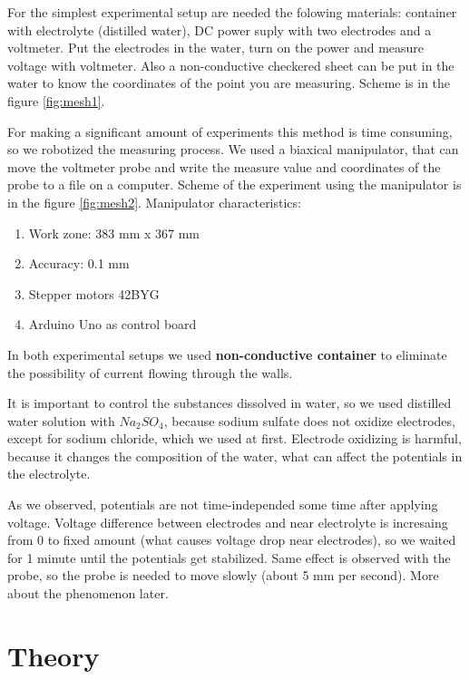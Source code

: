 \documentclass{article}
\begin{document}
For the simplest experimental setup are needed the folowing materials: container with electrolyte (distilled water), DC power suply with two electrodes and a voltmeter. Put the electrodes in the water, turn on the power and measure voltage with voltmeter. Also a non-conductive checkered sheet can be put in the water to know the coordinates of the point you are measuring. Scheme is in the figure \ref{fig:mesh1}.  \par

For making a significant amount of experiments this method is time consuming, so we robotized the measuring process. We used a biaxical manipulator, that can move the voltmeter probe and write the measure value and coordinates of the probe to a file on a computer. Scheme of the experiment using the manipulator is in the figure \ref{fig:mesh2}. Manipulator characteristics:
\begin{enumerate}
\item Work zone: 383 mm x 367 mm
\item Accuracy: 0.1 mm
\item Stepper motors 42BYG
\item Arduino Uno as control board
\end{enumerate}

In both experimental setups we used \textbf{non-conductive container} to eliminate the possibility of current flowing through the walls.\par

It is important to control the substances dissolved in water, so we used distilled water solution with $Na_2SO_4$, because sodium sulfate does not oxidize electrodes, except for sodium chloride, which we used at first. Electrode oxidizing is harmful, because it changes the composition of the water, what can affect the potentials in the electrolyte.\par

As we observed, potentials are not time-independed some time after applying voltage. Voltage difference between electrodes and near electrolyte is incresaing from 0 to fixed amount (what causes voltage drop near electrodes), so we waited for 1 minute until the potentials get stabilized. Same effect is observed with the probe, so the probe is needed to move slowly (about 5 mm per second). More about the phenomenon later. \par


\section{Theory}
\end{document}
